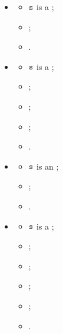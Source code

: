 \begin{itemize}
  \item {}
  \begin{itemize}
    \item $\texttt{s}$ is a \returnstatement{$\ve$};
    \item \Prosemapopt{$\renamelocalsexpr$}{$\ve$}{$\vep$};
    \item {}.
  \end{itemize}

  \item {}
  \begin{itemize}
    \item $\texttt{s}$ is a \conditionalstatement{$\ve$}{$\vsone$}{$\vstwo$};
    \item \Proserenamelocalsexpr{$\ve$}{$\vep$};
    \item \Proserenamelocalsstmt{$\vsone$}{$\vsonep$};
    \item \Proserenamelocalsstmt{$\vstwo$}{$\vstwop$};
    \item \Proseeqdef{$\news$}{\conditionalstatement{$\vep$}{$\vsonep$}{$\vstwop$}}.
  \end{itemize}

  \item {}
  \begin{itemize}
    \item $\texttt{s}$ is an \assertionstatement{$\ve$};
    \item \Proserenamelocalsexpr{$\ve$}{$\vep$};
    \item \Proseeqdef{$\news$}{\assertionstatement{$\vep$}}.
  \end{itemize}

  \item {}
  \begin{itemize}
    \item $\texttt{s}$ is a \forstatement{$\id$}{$\estart$}{$\dir$}{$\eend$}{$\vbody$}{$\velimitopt$};
    \item \Proserenamelocalsexpr{$\estart$}{$\estartp$};
    \item \Proserenamelocalsexpr{$\eend$}{$\eendp$};
    \item \Proserenamelocalsstmt{$\vbody$}{$\vbodyp$};
    \item \Prosemapopt{$\renamelocalsexpr$}{$\velimitopt$}{$\velimitoptp$};
    \item \Proseeqdef{$\news$}{\forstatement{$\id$}{\\ $\estartp$}{$\dir$}{$\eendp$}{$\vbodyp$}{$\velimitoptp$}}.
  \end{itemize}


\end{itemize}
